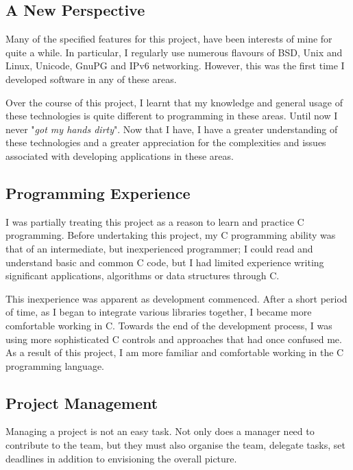 
\subsection{A New Perspective}

Many of the specified features for this project, have been interests of
mine for quite a while. In particular, I regularly use numerous flavours
of BSD, Unix and Linux, Unicode, GnuPG and IPv6 networking. However, this 
was the first time I developed software in any of these areas.


Over the course of this project, I learnt that my knowledge and general
usage of these technologies is quite different to programming in these
areas. Until now I never "\emph{got my hands dirty}". Now that I have, I
have a greater understanding of these technologies and a greater
appreciation for the complexities and issues associated with developing
applications in these areas.

\subsection{Programming Experience}

I was partially treating this project as a reason to learn and practice
C programming. Before undertaking this project, my C programming ability
was that of an intermediate, but inexperienced programmer; I could read 
and understand basic and common C code, but I had limited experience
writing significant applications, algorithms or data structures through
C.


This inexperience was apparent as development commenced. After a short
period of time, as I began to integrate various libraries together, I
became more comfortable working in C. Towards the end of the
development process, I was using more sophisticated C controls and
approaches that had once confused me. As a result of this project, I am
more familiar and comfortable working in the C programming language.


\subsection{Project Management}


Managing a project is not an easy task. Not only does a manager need to
contribute to the team, but they must also organise the team, delegate
tasks, set deadlines in addition to envisioning the overall picture.


